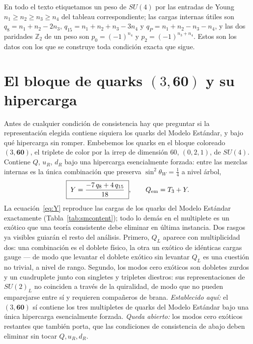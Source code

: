 \documentclass[11pt,a4paper]{article}
\begin{document}
En todo el texto etiquetamos un peso de $SU(4)$ por las entradas de Young
$n_1\ge n_2\ge n_3\ge n_4$ del tableau correspondiente; las cargas internas \'utiles son
$q_8=n_1+n_2-2n_3$, $q_{15}=n_1+n_2+n_3-3n_4$ y $q_P=n_1+n_2-n_3-n_4$, y las dos
paridades $\mathbb{Z}_2$ de un peso son $p_0=(-1)^{n_4}$ y $p_2=(-1)^{n_3+n_4}$. Estos
son los datos con los que se construye toda condici\'on exacta que sigue.

\section{El bloque de quarks \texorpdfstring{$(3,\mathbf{60})$}{(3,60)} y su hipercarga}\label{sec:hypercharge}
Antes de cualquier condici\'on de consistencia hay que preguntar si la representaci\'on
elegida contiene siquiera los quarks del Modelo Est\'andar, y bajo qu\'e hipercarga sin
romper. Embebemos los quarks en el bloque coloreado $(3,\mathbf{60})$, el triplete de
color por la irrep de dimensi\'on $60$, $(0,2,1)$, de $SU(4)$. Contiene $Q$, $u_R$, $d_R$
bajo una hipercarga esencialmente forzada: entre las mezclas internas es la \'unica
combinaci\'on que preserva $\sin^2\theta_W=\tfrac14$ a nivel \'arbol,
\begin{equation}
\boxed{\;Y=\frac{-7\,q_8+4\,q_{15}}{18}\;},\qquad Q_{\rm em}=T_3+Y .
\label{eq:Y}
\end{equation}
La ecuaci\'on~\eqref{eq:Y} reproduce las cargas de los quarks del Modelo Est\'andar
exactamente (Tabla~\ref{tab:smcontent}); todo lo dem\'as en el multiplete es un ex\'otico
que una teor\'ia consistente debe eliminar en \'ultima instancia. Dos rasgos ya visibles
guiar\'an el resto del an\'alisis. Primero, $Q_L$ aparece con multiplicidad dos: una
combinaci\'on es el doblete f\'isico, la otra un ex\'otico de id\'enticas cargas gauge ---
de modo que levantar el doblete ex\'otico sin levantar $Q_L$ es una cuesti\'on no trivial,
a nivel de rango. Segundo, los modos cero ex\'oticos son dobletes zurdos y un cuadruplete
junto con singletes y tripletes diestros: sus representaciones de $SU(2)_L$ no coinciden
a trav\'es de la quiralidad, de modo que no pueden emparejarse entre s\'i y requieren
compa\~neros de brana. \emph{Establecido aqu\'i:} el $(3,\mathbf{60})$ s\'i contiene los
tres multipletes de quarks del Modelo Est\'andar bajo una \'unica hipercarga esencialmente
forzada. \emph{Queda abierto:} los modos cero ex\'oticos restantes que tambi\'en porta,
que las condiciones de consistencia de abajo deben eliminar sin tocar $Q,u_R,d_R$.
\end{document}

